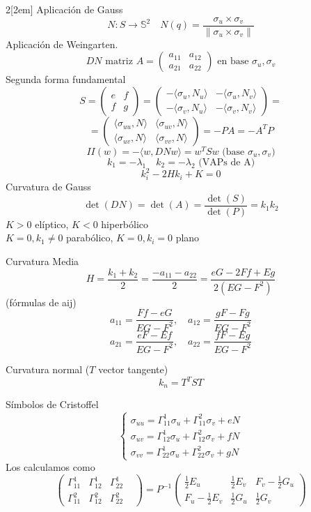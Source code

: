 \documentclass{myclass}
\begin{document}
\begin{multicols}{2}[\columnsep2em]
Aplicación de Gauss
\[
N: S\to \mathbb{S}^2 \quad N(q) = \frac{\sigma _u\times \sigma _v}{\|\sigma _u\times \sigma _v\|}
\]
Aplicación de Weingarten.
\[
  DN \text{ matriz } A = \begin{pmatrix} a_{11} & a_{12} \\ a_{21} & a_{22} \end{pmatrix} \text{ en base }\sigma _u, \sigma _v 
\]
Segunda forma fundamental
\[
  S = \begin{pmatrix} e & f \\ f & g \end{pmatrix} = \begin{pmatrix} -\langle \sigma _u , N_u \rangle & -\langle \sigma _u , N_v \rangle \\ -\langle \sigma _v , N_u \rangle & -\langle \sigma _v , N_v \rangle   \end{pmatrix}= \]
  \[=   \begin{pmatrix} \langle \sigma _{uu} , N \rangle & \langle \sigma _{uv} , N \rangle \\ \langle \sigma _{uv} , N \rangle & \langle \sigma _{vv} , N \rangle   \end{pmatrix} =  -PA = -A^TP 
\]
\columnbreak
\[
II(w) = -\langle w, DN w \rangle  = w^TSw \text{ (base } \sigma_u, \sigma _v)
\] 
\[
k_1=-\lambda_1 \quad k_2 = -\lambda_2 \text{  (VAPs de A)}
\] 
\[
  k_i^2 -2Hk_i+K = 0
\] 
Curvatura de Gauss
\[
\det(DN) = \det(A) = \frac{\det(S)}{\det(P)} = k_1k_2
\]
$K>0$ elíptico,  $K<0$ hiperbólico \\
$K=0, k_1\neq 0$ parabólico,  $K=0, k_i=0$ plano

Curvatura Media
\[
H = \frac{k_1+k_2}{2} = \frac{-a_{11}-a_{22}}{2}= \frac{eG-2Ff+Eg}{2(EG-F^2)}
\] 
(fórmulas de aij)
\[
a_{11} = \frac{Ff-eG}{EG-F^2}, \quad a_{12} = \frac{gF-Fg}{EG-F^2}
\] 
\[
  a_{21}=\frac{eF-Ef}{EG-F^2}, \quad a_{22} = \frac{fF-Eg}{EG-F^2}
\] 

Curvatura normal ($T$ vector tangente)
\[
k_n = T^TST
\] 

Símbolos de Cristoffel
  \[
  \begin{cases}
    \sigma _{uu} = \Gamma_{11}^1\sigma _u + \Gamma_{11}^2 \sigma _v + eN \\
    \sigma _{uv} = \Gamma_{12}^1\sigma _u + \Gamma_{12}^2 \sigma _v + fN \\
    \sigma _{vv} = \Gamma_{22}^1\sigma _u + \Gamma_{22}^2 \sigma _v + gN
  \end{cases}
  \]
Los calculamos como
\[
  \begin{pmatrix} \Gamma_{11}^1 & \Gamma_{12}^1 & \Gamma_{22}^1 \\ \Gamma_{11}^2 & \Gamma_{12}^2 & \Gamma_{22}^2 &  \end{pmatrix}  = P^{-1} \begin{pmatrix} \frac{1}{2}E_u & \frac{1}{2}E_v & F_v - \frac{1}{2}G_u \\ F_u - \frac{1}{2}E_v & \frac{1}{2}G_u & \frac{1}{2}G_v \end{pmatrix} 
\]


\end{multicols}
\end{document}
